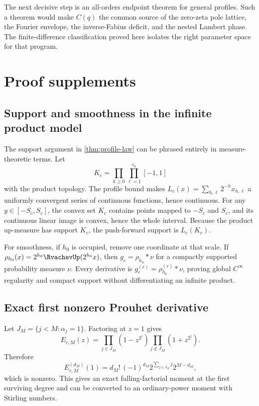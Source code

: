 \documentclass[11pt]{article}
\numberwithin{equation}{section}
\theoremstyle{definition}
\theoremstyle{remark}
\begin{document}
The next decisive step is an all-orders endpoint theorem for general profiles.
Such a theorem would make $C(q)$ the common source of the zero-zeta pole
lattice, the Fourier envelope, the inverse-Fabius deficit, and the nested
Lambert phase.  The finite-difference classification proved here isolates the
right parameter space for that program.

\appendix

\section{Proof supplements}
\label{app:proofs}

\subsection{Support and smoothness in the infinite product model}

The support argument in \cref{thm:profile-law} can be phrased entirely in
measure-theoretic terms.  Let
\[
 K_c=\prod_{h\ge0}\prod_{\ell=1}^{c_h}[-1,1]
\]
with the product topology.  The profile bound makes
$L_c(x)=\sum_{h,\ell}2^{-h}x_{h,\ell}$ a uniformly convergent series of
continuous functions, hence continuous.  For any $y\in[-S_c,S_c]$, the convex
set $K_c$ contains points mapped to $-S_c$ and $S_c$, and its continuous linear
image is convex, hence the whole interval.  Because the product up-measure has
support $K_c$, the push-forward support is $L_c(K_c)$.

For smoothness, if $h_0$ is occupied, remove one coordinate at that scale.  If
$\rho_{h_0}(x)=2^{h_0}\RvachevUp(2^{h_0}x)$, then
$g_c=\rho_{h_0}*\nu$ for a compactly supported probability measure $\nu$.
Every derivative is
$g_c^{(r)}=\rho_{h_0}^{(r)}*\nu$, proving global $C^\infty$ regularity and
compact support without differentiating an infinite product.

\subsection{Exact first nonzero Prouhet derivative}

Let $J_M=\{j<M:\alpha_j=1\}$.  Factoring at $z=1$ gives
\[
 E_{c,M}(z)
 =\prod_{j\in J_M}(1-z^{2^j})
  \prod_{j\notin J_M}(1+z^{2^j}).
\]
Therefore
\begin{equation}
 E_{c,M}^{(d_M)}(1)
 =d_M!\,(-1)^{d_M}
 2^{\sum_{j\in J_M}j}
 2^{M-d_M},
 \label{eq:first-Prouhet-derivative}
\end{equation}
which is nonzero.  This gives an exact falling-factorial moment at the first
surviving degree and can be converted to an ordinary-power moment with Stirling
numbers.
\end{document}
